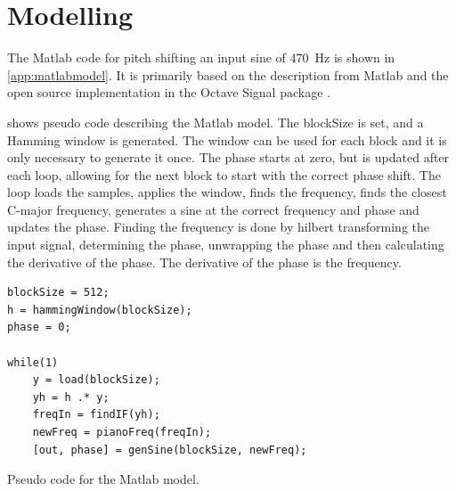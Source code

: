 
\section{Modelling}
\label{sec:PureSineModelling}

The Matlab code for pitch shifting an input sine of \SI{470}{\hertz} is shown in \cref{app:matlabmodel}. It is primarily based on the description from Matlab \cite{MatlabIF} and the open source implementation in the Octave Signal package \cite{OctaveHilbert}.

 shows pseudo code describing the Matlab model.
The blockSize is set, and a Hamming window is generated.
The window can be used for each block and it is only necessary to generate it once.
The phase starts at zero, but is updated after each loop, allowing for the next block to start with the correct phase shift.
The loop loads the samples, applies the window, finds the frequency, finds the closest C-major frequency, generates a sine at the correct frequency and phase and updates the phase.
Finding the frequency is done by hilbert transforming the input signal, determining the phase, unwrapping the phase and then calculating the derivative of the phase.
The derivative of the phase is the frequency.

\begin{listing}
	\begin{verbatim}
blockSize = 512;
h = hammingWindow(blockSize);
phase = 0;

while(1)
	y = load(blockSize);
	yh = h .* y;
	freqIn = findIF(yh);
	newFreq = pianoFreq(freqIn);
	[out, phase] = genSine(blockSize, newFreq);
	\end{verbatim}
	\caption{Pseudo code for the Matlab model.}
	\label{code:matlabmodel}
\end{listing}

